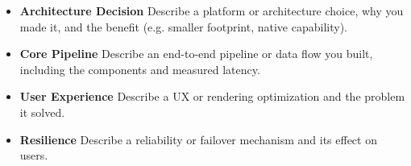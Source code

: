 \begin{itemize}
    \item \textbf{Architecture Decision} Describe a platform or architecture choice, why you made it, and the benefit (e.g. smaller footprint, native capability).
    \item \textbf{Core Pipeline} Describe an end-to-end pipeline or data flow you built, including the components and measured latency.
    \item \textbf{User Experience} Describe a UX or rendering optimization and the problem it solved.
    \item \textbf{Resilience} Describe a reliability or failover mechanism and its effect on users.
\end{itemize}
